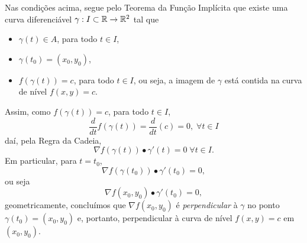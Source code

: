 Nas condições acima, segue pelo Teorema da Função Implícita que existe uma curva diferenciável \(\gamma: I\subset\mathbb{R} \to\mathbb{R}^2\) tal que
    \begin{itemize}
        \item \(\gamma(t) \in A\), para todo \(t\in I\),
        \item \(\gamma(t_0) = (x_0,y_0)\),
        \item \(f(\gamma(t)) = c\), para todo \(t\in I\), ou seja, a imagem de \(\gamma\) está contida na curva de nível \(f(x,y) = c\).
    \end{itemize}
Assim, como \(f(\gamma(t)) = c\), para todo \(t\in I\), \[\frac{d}{dt}f(\gamma(t)) = \frac{d}{dt}(c) = 0,\; \forall t\in I\] daí, pela Regra da Cadeia, \[\nabla f(\gamma(t))\bullet \gamma'(t) = 0\; \forall t\in I.\] Em particular, para \(t = t_0\), \[\nabla f(\gamma(t_0))\bullet \gamma'(t_0) = 0,\] ou seja \[\nabla f(x_0,y_0)\bullet \gamma'(t_0) = 0,\] geometricamente, concluímos que \(\nabla f(x_0,y_0)\) é \textit{perpendicular} à \(\gamma\) no ponto \(\gamma(t_0) = (x_0,y_0)\) e, portanto, perpendicular à curva de nível \(f(x,y) = c\) em \((x_0,y_0)\).
